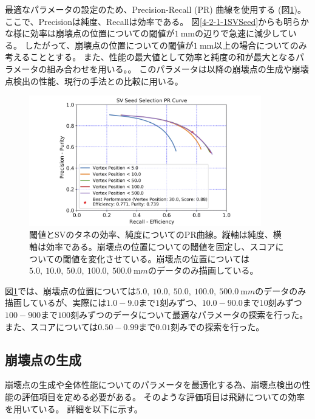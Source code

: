最適なパラメータの設定のため、Precision-Recall (PR) 曲線を使用する (図\ref{4-2-1-2PRCurve})。
ここで、Precisionは純度、Recallは効率である。
図\ref{4-2-1-1SVSeed}からも明らかな様に効率は崩壊点の位置についての閾値が$1\ \mathrm{mm}$の辺りで急速に減少している。
したがって、崩壊点の位置についての閾値が$1\ \mathrm{mm}$以上の場合についてのみ考えることとする。
また、性能の最大値として効率と純度の和が最大となるパラメータの組み合わせを用いる。。
このパラメータは以降の崩壊点の生成や崩壊点検出の性能、現行の手法との比較に用いる。

\begin{figure}[htbp]
 \centering
 \includegraphics[width=0.9\textwidth, clip]{Figure/4VertexFinderwithDL/4-2-1-2PRCurve.png}
 \caption[閾値とSVのタネの効率、純度についてのPR曲線]{閾値とSVのタネの効率、純度についてのPR曲線。縦軸は純度、横軸は効率である。崩壊点の位置についての閾値を固定し、スコアについての閾値を変化させている。崩壊点の位置については$5.0,\ 10.0,\ 50.0,\ 100.0,\ 500.0\ {\mathrm mm}$のデータのみ描画している。}
 \label{4-2-1-2PRCurve}
\end{figure}

図\ref{4-2-1-2PRCurve}では、崩壊点の位置については$5.0,\ 10.0,\ 50.0,\ 100.0,\ 500.0\ {\mathrm mm}$のデータのみ描画しているが、実際には$1.0-9.0$まで$1$刻みずつ、$10.0-90.0$まで$10$刻みずつ$100-900$まで$100$刻みずつのデータについて最適なパラメータの探索を行った。
また、スコアについては$0.50-0.99$まで$0.01$刻みでの探索を行った。


\subsection{崩壊点の生成} \label{VFDL:TPVFDL:VertexProduction}

崩壊点の生成や全体性能についてのパラメータを最適化する為、崩壊点検出の性能の評価項目を定める必要がある。
そのような評価項目は飛跡についての効率を用いている。
詳細を以下に示す。

